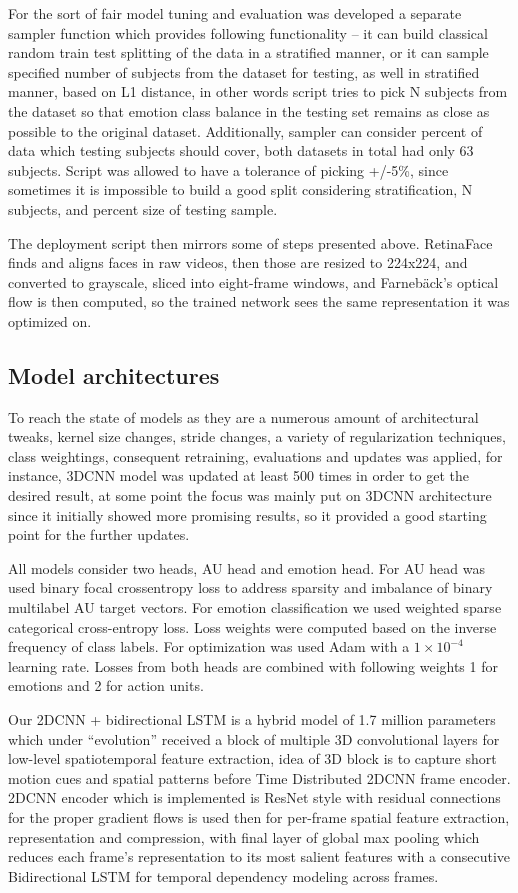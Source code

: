 \documentclass{article}
\begin{document}
For the sort of fair model tuning and evaluation was developed a separate sampler function which provides following functionality – it can build classical random train test splitting of the data in a stratified manner, or it can sample specified number of subjects from the dataset for testing, as well in stratified manner, based on L1 distance, in other words script tries to pick N subjects from the dataset so that emotion class balance in the testing set remains as close as possible to the original dataset. Additionally, sampler can consider percent of data which testing subjects should cover, both datasets in total had only 63 subjects. Script was allowed to have a tolerance of picking +/-5\%, since sometimes it is impossible to build a good split considering stratification, N subjects, and percent size of testing sample.

The deployment script then mirrors some of steps presented above. RetinaFace finds and aligns faces in raw videos, then those are resized to 224x224, and converted to grayscale, sliced into eight-frame windows, and Farnebäck’s optical flow is then computed, so the trained network sees the same representation it was optimized on.

\subsection{Model architectures}
To reach the state of models as they are a numerous amount of architectural tweaks, kernel size changes, stride changes, a variety of regularization techniques, class weightings, consequent retraining, evaluations and updates was applied, for instance, 3DCNN model was updated at least 500 times in order to get the desired result, at some point the focus was mainly put on 3DCNN architecture since it initially showed more promising results, so it provided a good starting point for the further updates.

All models consider two heads, AU head and emotion head. For AU head was used binary focal cross\-entropy loss to address sparsity and imbalance of binary multilabel AU target vectors. For emotion classification we used weighted sparse categorical cross-entropy loss. Loss weights were computed based on the inverse frequency of class labels. For optimization was used Adam with a $1 \times 10^{-4}$ learning rate. Losses from both heads are combined with following weights 1 for emotions and 2 for action units.

Our 2DCNN + bidirectional LSTM is a hybrid model of 1.7 million parameters which under “evolution” received a block of multiple 3D convolutional layers for low-level spatiotemporal feature extraction, idea of 3D block is to capture short motion cues and spatial patterns before Time Distributed 2DCNN frame encoder. 2DCNN encoder which is implemented is ResNet style with residual connections for the proper gradient flows is used then for per-frame spatial feature extraction, representation and compression, with final layer of global max pooling which reduces each frame’s representation to its most salient features with a consecutive Bidirectional LSTM for temporal dependency modeling across frames.
\end{document}
